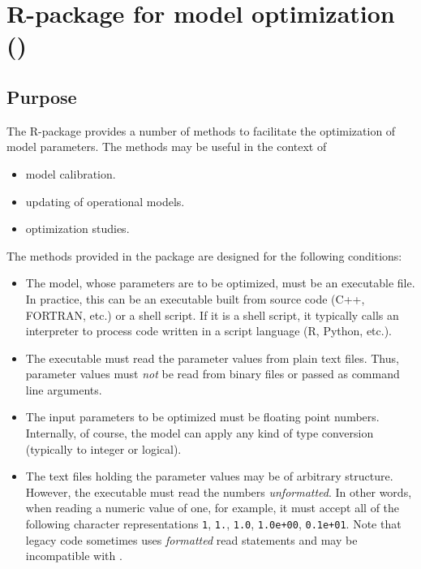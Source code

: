 

\chapter{R-package for model optimization ()} \label{chap:mops}
\renewcommand{\tabdir}{chapters/mops/tab}
\renewcommand{\figdir}{chapters/mops/fig}

\section{Purpose} \label{sec:mops:purpose}

The R-package  provides a number of methods to facilitate the optimization of model parameters. The methods may be useful in the context of
\begin{itemize}
  \item model calibration.
  \item updating of operational models.
  \item optimization studies.
\end{itemize}

The methods provided in the  package are designed for the following conditions:

\begin{itemize}
  \item The model, whose parameters are to be optimized, must be an executable file. In practice, this can be an executable built from source code (C++, FORTRAN, etc.) or a shell script. If it is a shell script, it typically calls an interpreter to process code written in a script language (R, Python, etc.).
  \item The executable must read the parameter values from plain text files. Thus, parameter values must \emph{not} be read from binary files or passed as command line arguments.
  \item The input parameters to be optimized must be floating point numbers. Internally, of course, the model can apply any kind of type conversion (typically to integer or logical).
  \item The text files holding the parameter values may be of arbitrary structure. However, the executable must read the numbers \emph{unformatted}. In other words, when reading a numeric value of one, for example, it must accept all of the following character representations \texttt{1}, \texttt{1.}, \texttt{1.0}, \texttt{1.0e+00}, \texttt{0.1e+01}. Note that legacy code sometimes uses \emph{formatted} read statements and may be incompatible with .
\end{itemize}


